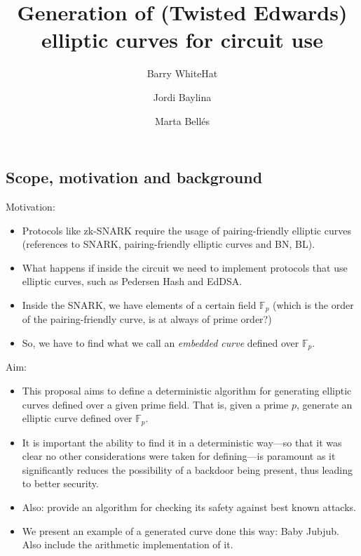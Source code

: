\documentclass{article}
\title{Generation of (Twisted Edwards) elliptic curves for circuit use 
			\vspace{-0.2cm} }
\author[1]{Barry WhiteHat}
\author[2]{Jordi Baylina}
\author[2,3]{Marta Bellés}
\affil[1]{Ethereum foundation}
\affil[2]{iden3}
\affil[3]{Universitat Pompeu Fabra}
\newcommand{\Fp}{\ensuremath{\mathbb{F}_p}}
\begin{document}
\begin{spacing}{1.2}	

\maketitle  	  \vspace{1.5cm}
\tableofcontents  \vspace{0.5cm}


\newpage

\section{Scope, motivation and background}
	
	Motivation:
	\begin{itemize}
		\item 	Protocols like zk-SNARK require the usage of pairing-friendly elliptic curves (references to SNARK, pairing-friendly elliptic curves and BN, BL).
		\item 	What happens if inside the circuit we need to implement protocols that use elliptic curves, such as Pedersen Hash and EdDSA. 
		\item 	Inside the SNARK, we have elements of a certain field $\Fp$ (which is the order of the pairing-friendly curve, is at always of prime order?)
		\item 	So, we have to find what we call an {\it embedded curve} defined over $\Fp$.
	\end{itemize}
	
	Aim:
	\begin{itemize}
		\item 	This proposal aims to define a deterministic algorithm for generating elliptic curves defined over a given prime field. 
				That is, given a prime $p$, generate an elliptic curve defined over $\Fp$.
		\item 	It is important the ability to find it in a deterministic way---so that it was clear no other considerations were taken for defining---is 
				paramount as it significantly reduces the possibility of a backdoor being present, thus leading to better security.
		\item 	Also: provide an algorithm for checking its safety against best known attacks. 
		\item 	We present an example of a generated curve done this way: Baby Jubjub. Also include the arithmetic implementation of it. 
	\end{itemize}


\end{spacing}
\end{document}
